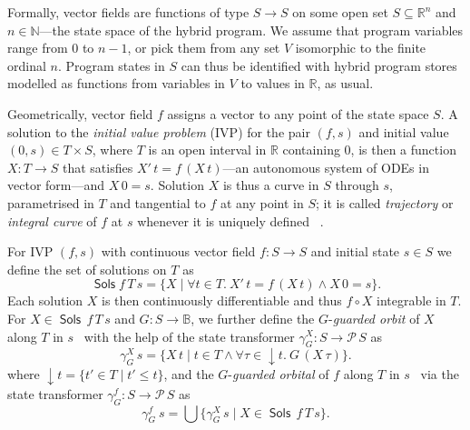 \documentclass[envcountsames]{llncs}
\newcommand{\Pow}{\mathcal{P}}
\newcommand{\reals}{\mathbb{R}}
\newcommand{\bools}{\mathbb{B}}
\newcommand{\Sols}{\mathop{\mathsf{Sols}}}
\begin{document}
Formally, vector fields are functions of type $S\to S$ on some open set
$S\subseteq \reals^n$ and $n\in\mathbb{N}$---the state space of
the hybrid program. We assume that program variables range from $0$ to
$n-1$, or pick them from any set $V$ isomorphic to the finite ordinal
$n$. Program states in $S$ can thus be identified with hybrid program
stores modelled as functions from variables in $V$ to values in
$\reals$, as usual.

Geometrically, vector field $f$ assigns a vector to any point of the
state space
$S$. A solution to the \emph{initial value problem} (IVP) for the pair
$(f,s)$ and initial value $(0,s)\in T\times S$, where $T$ is an open
interval in $\reals$ containing $0$, is then a function $X:T\to S$
that satisfies $X'\, t = f\, (X\, t)$---an autonomous system of ODEs
in vector form---and $X\, 0 = s$. Solution
$X$ is thus a curve in $S$ through $s$, parametrised in $T$ and
tangential to $f$ at any point in $S$; it is called \emph{trajectory}
or \emph{integral curve} of $f$ at $s$ whenever it is uniquely
defined ~\cite{Hirsch09,Teschl12}.

For IVP $(f,s)$ with continuous vector field $f:S\to S$ and initial
state $s\in S$ we define the set of solutions on
$T$ as
\begin{equation*}
\Sols f\, T\, s = \{X \mid \forall t\in T.\  X'\, t = f\, (X\, t)\land X\, 0 = s\}.
\end{equation*}
Each solution $X$ is then continuously differentiable and thus
$f\circ X$ integrable in $T$.  For $X\in \Sols\, f\, T\, s$ and
$G:S\to\bools$, we further define the $G$-\emph{guarded orbit} of $X$
along $T$ in $s$~\cite{MuniveS19} with the help of the state transformer
$\gamma^X_G:S\to \Pow\, S$ as 
\begin{equation*}
\gamma^X_{G}\, s= \{X\, t\mid t\in T\land \forall \tau\in
{\downarrow}t.\ G\, (X\, \tau)\}.
\end{equation*}
where ${\downarrow}t = \{t'\in T\mid t'\le t\}$, and the
$G$-\emph{guarded orbital} of $f$ along $T$ in $s$~\cite{MuniveS19}
via the state transformer $\gamma^f_G:S\to \Pow\, S$ as
\begin{equation*}
  \gamma^f_G\ s = \bigcup\{\gamma^X_G\, s\mid X\in \Sols\, f\, T\, s\}.
\end{equation*}
\end{document}
